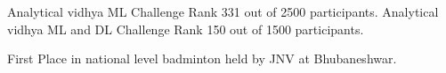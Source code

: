 %
%
%


\renewcommand{\baselinestretch}{1.3}

\begin{scholarship}
	\scholarshipentry{}
					{Analytical vidhya ML Challenge Rank 331 out of 2500 participants.}
						\scholarshipentry{}
					{Analytical vidhya ML and DL Challenge Rank 150 out of 1500 participants.}
    
	\scholarshipentry{}
					{First Place in national level badminton held by JNV at Bhubaneshwar.}
\end{scholarship}\\
